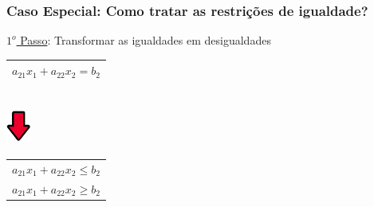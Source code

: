 \documentclass{beamer}
\begin{document}
\begin{frame}
	\frametitle{Caso Especial: Como tratar as restrições de igualdade?}
	{
		\begin{block}{{\color{yellow}\underline{$1^o$ Passo}:} Transformar as igualdades em desigualdades}
			
			\begin{table}
				\begin{tabular}{|c|}
					\hline
					\cellcolor{green!80} $a_{21}x_1 + a_{22}x_2 = b_2$ \\
					\hline					
				\end{tabular} \\
				\includegraphics[width=0.8cm,height=1.2cm]{setabaixo.png} \\
				\begin{tabular}{|c|}
					\hline
					\cellcolor{green!80} $a_{21}x_1 + a_{22}x_2 \le b_2$ \\
					\cellcolor{green!80} $a_{21}x_1 + a_{22}x_2 \ge b_2$ \\
					\hline					
				\end{tabular} \\
			\end{table}


\end{block}}
\end{frame}
\end{document}
